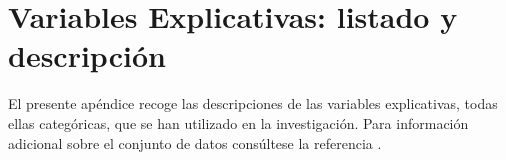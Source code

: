 \documentclass[a4paper, 11pt]{article}
\begin{document}
\section{Variables Explicativas: listado y descripción}
\label{features_description}
El presente apéndice recoge las descripciones de las variables explicativas, todas ellas categóricas, 
que se han utilizado en la investigación. Para información adicional sobre el conjunto de datos 
consúltese la referencia \cite{NFCS01}.
\end{document}
